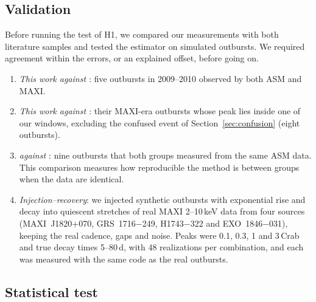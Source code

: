 \documentclass[fleqn,usenatbib]{mnras}
\begin{document}
\subsection{Validation}
\label{sec:validation}

Before running the test of H1, we compared our measurements with both literature samples and tested the estimator on simulated outbursts. We required agreement within the errors, or an explained offset, before going on.
\begin{enumerate}
\item \textit{This work against \citet{YanYu2015}}: five outbursts in 2009--2010 observed by both ASM and MAXI.
\item \textit{This work against \citet{Saraswati2025}}: their MAXI-era outbursts whose peak lies inside one of our windows, excluding the confused event of Section~\ref{sec:confusion} (eight outbursts).
\item \textit{\citet{YanYu2015} against \citet{Saraswati2025}}: nine outbursts that both groups measured from the same ASM data. This comparison measures how reproducible the method is between groups when the data are identical.
\item \textit{Injection--recovery}: we injected synthetic outbursts with exponential rise and decay into quiescent stretches of real MAXI 2--10\,keV data from four sources (MAXI~J1820+070, GRS~1716$-$249, H1743$-$322 and EXO~1846$-$031), keeping the real cadence, gaps and noise. Peaks were 0.1, 0.3, 1 and 3\,Crab and true decay times 5--80\,d, with 48 realizations per combination, and each was measured with the same code as the real outbursts.
\end{enumerate}

\subsection{Statistical test}
\label{sec:stats}
\end{document}
